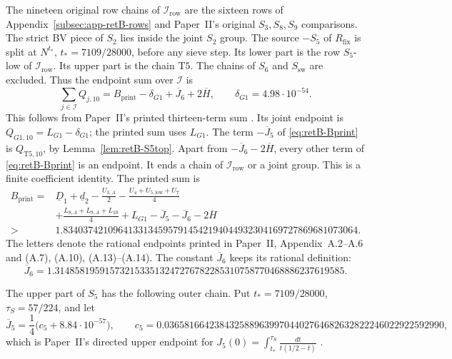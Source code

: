 The nineteen original row chains of $\mathcal I_{\mathrm{row}}$
are the sixteen rows of Appendix~\ref{subsec:app-retB-rows} and
Paper~II's original $S_3,S_8,S_9$ comparisons. The strict BV piece of $S_2$ lies inside
the joint $S_2$ group. The source $-S_5$ of $R_{\mathrm{fix}}$ is split at
$N^{t_*}$, $t_*=7109/28000$, before any sieve step. Its lower part is the row
$S_5$-low of $\mathcal I_{\mathrm{row}}$. Its upper part is the chain
$\mathrm{T5}$. The chains of $S_6$ and $S_{\mathrm{sw}}$ are excluded.
Thus the endpoint sum over $\mathcal I$ is
\begin{equation}\label{eq:retB-base-endpoints}
 \sum_{j\in\mathcal I} Q_{j,10}
 =B_{\mathrm{print}}-\delta_{G1}+\overline J_6+2\overline H,
 \qquad \delta_{G1}=4.98\cdot10^{-54}.
\end{equation}
This follows from Paper~II's printed thirteen-term sum
\cite[\S6.4, immediately before (6.6)]{PaperII}.
Its joint endpoint is $Q_{G1,10}=L_{G1}-\delta_{G1}$;
the printed sum uses $L_{G1}$. The term $-\overline J_5$ of
\eqref{eq:retB-Bprint} is $Q_{\mathrm{T5},10}$, by
Lemma~\ref{lem:retB-S5top}. Apart from $-\overline J_6-2\overline H$,
every other term of \eqref{eq:retB-Bprint} is an endpoint. It ends a
chain of $\mathcal I_{\mathrm{row}}$ or a joint group.
This is a finite coefficient identity.
The printed sum is
\begin{equation}\label{eq:retB-Bprint}
\begin{aligned}
 B_{\mathrm{print}}={}&\underline D_1+\underline d_2-\frac{U_{3,A}}2
 -\frac{U_4+U_{5,\mathrm{low}}+U_7}{4}\\
 &+\frac{L_{8,A}+L_{9,A}+L_{10}}4+L_{G1}
 -\overline J_5-\overline J_6-2\overline H\\
 >&1.83403742109641331345957914542194044932304169727869681073064.
\end{aligned}
\end{equation}
The letters denote the rational endpoints printed in Paper~II,
Appendix~A.2--A.6 and (A.7), (A.10), (A.13)--(A.14).
The constant $\overline J_6$ keeps its rational definition:
\begin{equation}\label{eq:retB-J6-endpoint}
 \overline J_6=1.3148581959157321533513247276782285310758770468886237619585.
\end{equation}

The upper part of $S_5$ has the following outer chain. Put
$t_*=7109/28000$, $\tau_S=57/224$, and let
\begin{equation}\label{eq:retB-J5-endpoint}
 \overline J_5=\frac14\bigl(c_5+8.84\cdot10^{-57}\bigr),\qquad
 c_5=0.03658166423843258896399704402764682632822246022922592990,
\end{equation}
which is Paper~II's directed upper endpoint for
$J_5(0)=\int_{t_*}^{\tau_S}\frac{dt}{t(1/2-t)}$
\cite[(5.16), (5.20), (A.14)--(A.14a)]{PaperII}.

